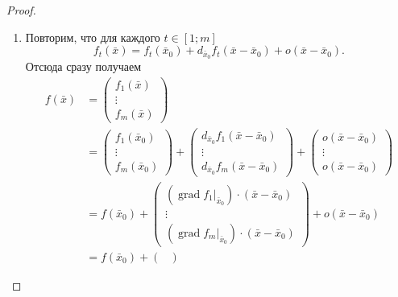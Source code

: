 \documentclass[12pt,a4paper]{article}
\DeclareMathOperator{\grad}{grad}
\begin{document}
    \begin{proof}
        \begin{enumerate}
            \item Повторим, что для каждого $t \in [1; m]$
                \[f_t(\bar{x}) = f_t(\bar{x}_0) + d_{\bar{x}_0}f_t(\bar{x} - \bar{x}_0) + o(\bar{x} - \bar{x}_0).\]
                Отсюда сразу получаем
                \begin{align*}
                    f(\bar{x})
                    &= \begin{pmatrix}
                        f_1(\bar{x})\\
                        \vdots\\
                        f_m(\bar{x})
                    \end{pmatrix}\\
                    &= \begin{pmatrix}
                        f_1(\bar{x}_0)\\
                        \vdots\\
                        f_m(\bar{x}_0)
                    \end{pmatrix}
                    + \begin{pmatrix}
                        d_{\bar{x}_0}f_1(\bar{x}-\bar{x}_0)\\
                        \vdots\\
                        d_{\bar{x}_0}f_m(\bar{x}-\bar{x}_0)
                    \end{pmatrix}
                    + \begin{pmatrix}
                        o(\bar{x}-\bar{x}_0)\\
                        \vdots\\
                        o(\bar{x}-\bar{x}_0)
                    \end{pmatrix}\\
                    &= f(\bar{x}_0)
                    + \begin{pmatrix}
                        (\grad f_1 |_{\bar{x}_0}) \cdot (\bar{x}-\bar{x}_0)\\
                        \vdots\\
                        (\grad f_m |_{\bar{x}_0}) \cdot (\bar{x}-\bar{x}_0)
                    \end{pmatrix}
                    + o(\bar{x}-\bar{x}_0)\\
                    &= f(\bar{x}_0)
                    + \begin{pmatrix}

\end{pmatrix}
\end{align*}
\end{enumerate}
\end{proof}
\end{document}
